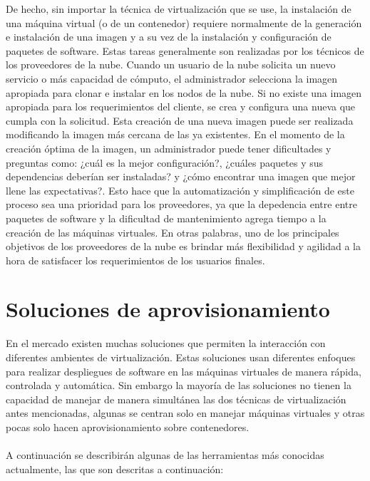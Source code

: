 \documentclass[conference, spanish]{IEEEtran}
\begin{document}
De hecho, sin importar la técnica de virtualización que se use, la instalación de una máquina virtual (o de un contenedor) requiere normalmente de la generación e instalación de una imagen y a su vez de la instalación y configuración de paquetes de software. Estas tareas generalmente son realizadas por los técnicos de los proveedores de la nube. Cuando un usuario de la nube solicita un nuevo servicio o más capacidad de cómputo, el administrador selecciona la imagen apropiada para clonar e instalar en los nodos de la nube. Si no existe una imagen apropiada para los requerimientos del cliente, se crea y configura una nueva que cumpla con la solicitud. Esta creación de una nueva imagen puede ser realizada modificando la imagen más cercana de las ya existentes. En el momento de la creación óptima de la imagen, un administrador puede tener dificultades y preguntas como: ¿cuál es la mejor configuración?, ¿cuáles paquetes y sus dependencias deberían ser instaladas? y ¿cómo encontrar una imagen que mejor llene las expectativas?. Esto hace que la automatización y simplificación de este proceso sea una prioridad para los proveedores, ya que la depedencia entre entre paquetes de software y la dificultad de mantenimiento agrega tiempo a la creación de las máquinas virtuales. En otras palabras, uno de los principales objetivos de los proveedores de la nube es brindar más flexibilidad y agilidad a la hora de satisfacer los requerimientos de los usuarios finales.



\section{Soluciones de aprovisionamiento}
En el mercado existen muchas soluciones que permiten la interacción con diferentes ambientes de virtualización. Estas soluciones usan diferentes enfoques para realizar despliegues de software en las máquinas virtuales de manera rápida, controlada y automática. Sin embargo la mayoría de las soluciones no tienen la capacidad de manejar de manera simultánea las dos técnicas de virtualización antes mencionadas, algunas se centran solo en manejar máquinas virtuales y otras pocas solo hacen aprovisionamiento sobre contenedores.\\
\\
A continuación se describirán algunas de las herramientas más conocidas actualmente, las que son descritas a continuación:
\end{document}
